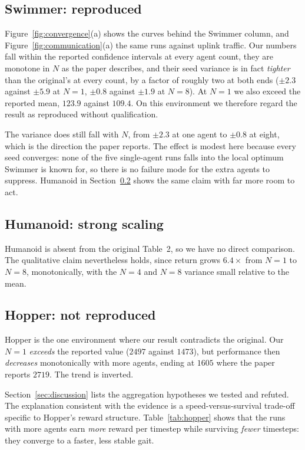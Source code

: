 \subsection{Swimmer: reproduced}

Figure~\ref{fig:convergence}(a) shows the curves behind the Swimmer column, and
Figure~\ref{fig:communication}(a) the same runs against uplink traffic.
Our numbers fall within the reported confidence intervals at every agent
count, they are monotone in $N$ as the paper describes, and their seed variance
is in fact \emph{tighter} than the original's at every count, by a factor of
roughly two at both ends ($\pm 2.3$ against $\pm 5.9$ at $N=1$, $\pm 0.8$
against $\pm 1.9$ at $N=8$). At $N=1$ we also exceed the reported mean, $123.9$
against $109.4$. On this environment we therefore regard the result as
reproduced without qualification.

The variance does still fall with $N$, from $\pm 2.3$ at one agent to $\pm 0.8$
at eight, which is the direction the paper reports. The effect is modest here
because every seed converges: none of the five single-agent runs falls into the
local optimum Swimmer is known for, so there is no failure mode for the extra
agents to suppress. Humanoid in Section~\ref{sec:humanoid} shows the same claim
with far more room to act.

\subsection{Humanoid: strong scaling}
\label{sec:humanoid}

Humanoid is absent from the original Table~2, so we have no direct comparison.
The qualitative claim nevertheless holds, since return grows $6.4\times$ from $N=1$ to $N=8$,
monotonically, with the $N=4$ and $N=8$ variance small relative to the mean.

\subsection{Hopper: not reproduced}
\label{sec:hopper}

Hopper is the one environment where our result contradicts the original. Our
$N=1$ \emph{exceeds} the reported value ($2497$ against $1473$), but
performance then \emph{decreases} monotonically with more agents, ending at
$1605$ where the paper reports $2719$. The trend is inverted.

Section~\ref{sec:discussion} lists the aggregation hypotheses we tested and
refuted. The explanation consistent with the evidence is a
speed-versus-survival trade-off specific to Hopper's reward structure.
Table~\ref{tab:hopper} shows that the runs with more agents earn \emph{more}
reward per timestep while surviving \emph{fewer} timesteps: they converge to a
faster, less stable gait.

